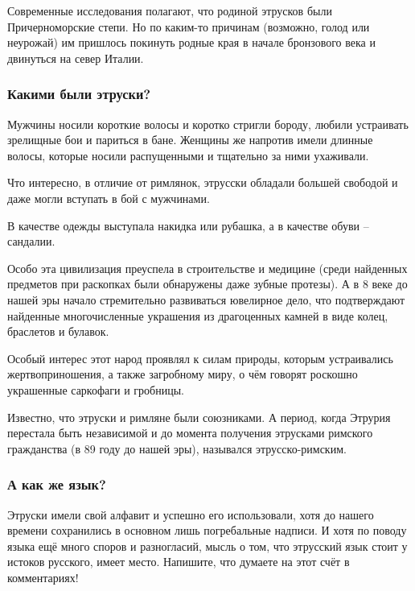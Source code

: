 Современные исследования полагают, что родиной этрусков были Причерноморские
степи. Но по каким-то причинам (возможно, голод или неурожай) им пришлось
покинуть родные края в начале бронзового века и двинуться на север Италии.

\subsubsection{Какими были этруски?}

Мужчины носили короткие волосы и коротко стригли бороду, любили устраивать
зрелищные бои и париться в бане. Женщины же напротив имели длинные волосы,
которые носили распущенными и тщательно за ними ухаживали. 

\begin{zznagolos}
Что интересно, в отличие от римлянок, этрусски обладали большей свободой и даже
могли вступать в бой с мужчинами.	
\end{zznagolos}

В качестве одежды выступала накидка или рубашка, а в качестве обуви – сандалии.

Особо эта цивилизация преуспела в строительстве и медицине (среди найденных
предметов при раскопках были обнаружены даже зубные протезы). А в 8 веке до
нашей эры начало стремительно развиваться ювелирное дело, что подтверждают
найденные многочисленные украшения из драгоценных камней в виде колец,
браслетов и булавок.


Особый интерес этот народ проявлял к силам природы, которым устраивались
жертвоприношения, а также загробному миру, о чём говорят роскошно украшенные
саркофаги и гробницы.

Известно, что этруски и римляне были союзниками. А период, когда Этрурия
перестала быть независимой и до момента получения этрусками римского
гражданства (в 89 году до нашей эры), назывался этрусско-римским.

\subsubsection{А как же язык?}

Этруски имели свой алфавит и успешно его использовали, хотя до нашего времени
сохранились в основном лишь погребальные надписи. И хотя по поводу языка ещё
много споров и разногласий, мысль о том, что этрусский язык стоит у истоков
русского, имеет место. Напишите, что думаете на этот счёт в комментариях!

